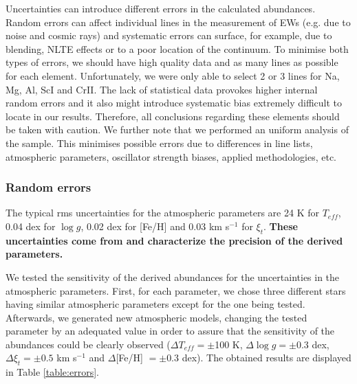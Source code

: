 \documentclass[oldversion]{aa}
\begin{document}
Uncertainties can introduce different errors in the calculated abundances. Random errors can affect individual lines in the measurement of EWs (e.g. due to noise and cosmic rays) and systematic errors can surface, for example, due to blending, NLTE effects or to a poor location of the continuum. To minimise both types of errors, we should have high quality data and as many lines as possible for each element. Unfortunately, we were only able to select 2 or 3 lines for Na, Mg, Al, ScI and CrII. The lack of statistical data provokes higher internal random errors and it also might introduce systematic bias extremely difficult to locate in our results. Therefore, all conclusions regarding these elements should be taken with caution. We further note that we performed an uniform analysis of the sample. This minimises possible errors due to differences in line lists, atmospheric parameters, oscillator strength biases, applied methodologies, etc. 




\subsubsection{Random errors}
\label{sec:random}


The typical rms uncertainties for the atmospheric parameters are 24 K for $T_{eff}$, 0.04 dex for $\log g$, 0.02 dex for [Fe/H] and 0.03 km s$^{-1}$ for $\xi_t$. \textbf{These uncertainties come from \citet{Sousa-2008} and characterize the precision of the derived parameters.}

We tested the sensitivity of the derived abundances for the uncertainties in the atmospheric parameters. First, for each parameter, we chose three different stars having similar atmospheric parameters except for the one being tested. Afterwards, we generated new atmospheric models, changing the tested parameter by an adequated value in order to assure that the sensitivity of the abundances could be clearly observed ($\Delta T_{eff}=\pm$100 K, $\Delta\log g=\pm0.3$ dex, $\Delta \xi_t=\pm0.5$ km s$^{-1}$ and $\Delta$[Fe/H] $=\pm$0.3 dex). The obtained results are displayed in Table \ref{table:errors}.   %
\end{document}
